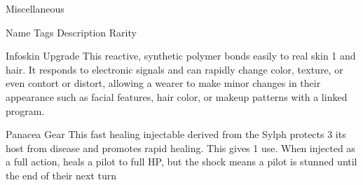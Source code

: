                                                        Miscellaneous

  Name           Tags            Description                                                              Rarity




Infoskin        Upgrade        This reactive, synthetic polymer bonds easily to real skin               1
                                and hair. It responds to electronic signals and can rapidly
                                change color, texture, or even contort or distort, allowing a
                               wearer to make minor changes in their appearance such as
                               facial features, hair color, or makeup patterns with a linked
                                program.

Panacea         Gear           This fast healing injectable derived from the Sylph protects             3
                                its host from disease and promotes rapid healing. This
                                gives 1 use. When injected as a full action, heals a pilot to
                               full HP, but the shock means a pilot is stunned until the end
                                of their next turn
